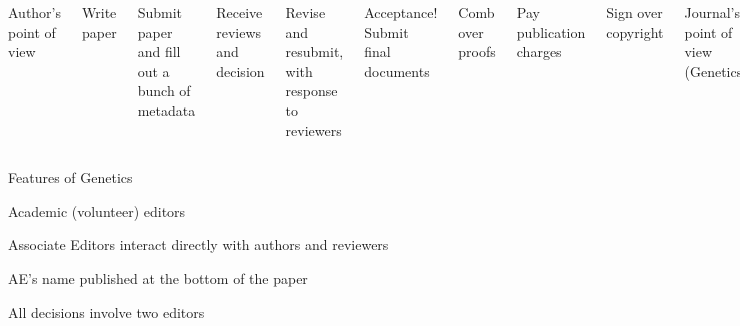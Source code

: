 \documentclass[aspectratio=169,12pt,t]{beamer}
\begin{document}
\begin{frame}{}

  \begin{columns}

    \color{title} Author's point of view

{\footnotesize

  \bi
\item Write paper
\item Submit paper and fill out a bunch of metadata
\item Receive reviews and decision
\item Revise and resubmit, with response to reviewers
\item Acceptance! Submit final documents
\item Comb over proofs
\item Pay publication charges
\item Sign over copyright
  \ei
}


    \color{title} Journal's point of view ({\lolit Genetics})


  \end{columns}

\end{frame}





\begin{frame}{Features of Genetics}

  \bbi
\item Academic (volunteer) editors
\item Associate Editors interact directly with authors and reviewers
\item AE's name published at the bottom of the paper
\item All decisions involve two editors
  \ei


\end{frame}
\end{document}
